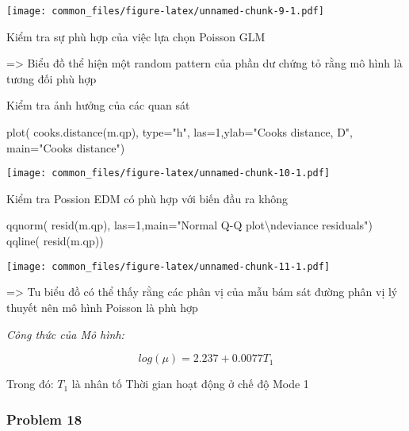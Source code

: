 \documentclass[
]{article}
\newenvironment{Shaded}{\begin{snugshade}}{\end{snugshade}}
\newcommand{\AttributeTok}[1]{\textcolor[rgb]{0.77,0.63,0.00}{#1}}
\newcommand{\DecValTok}[1]{\textcolor[rgb]{0.00,0.00,0.81}{#1}}
\newcommand{\FunctionTok}[1]{\textcolor[rgb]{0.00,0.00,0.00}{#1}}
\newcommand{\NormalTok}[1]{#1}
\newcommand{\SpecialCharTok}[1]{\textcolor[rgb]{0.00,0.00,0.00}{#1}}
\newcommand{\StringTok}[1]{\textcolor[rgb]{0.31,0.60,0.02}{#1}}
\begin{document}
\texttt{[image: common\_files/figure-latex/unnamed-chunk-9-1.pdf]}

Kiểm tra sự phù hợp của việc lựa chọn Poisson GLM

=\textgreater{} Biểu đồ thể hiện một random pattern của phần dư chứng tỏ
rằng mô hình là tương đối phù hợp

Kiểm tra ảnh hưởng của các quan sát

\begin{Shaded}
\begin{Highlighting}[]
\FunctionTok{plot}\NormalTok{( }\FunctionTok{cooks.distance}\NormalTok{(m.qp), }\AttributeTok{type=}\StringTok{"h"}\NormalTok{, }\AttributeTok{las=}\DecValTok{1}\NormalTok{,}\AttributeTok{ylab=}\StringTok{"Cook\textquotesingle{}s distance, D"}\NormalTok{, }\AttributeTok{main=}\StringTok{"Cook\textquotesingle{}s distance"}\NormalTok{)}
\end{Highlighting}
\end{Shaded}

\texttt{[image: common\_files/figure-latex/unnamed-chunk-10-1.pdf]}

Kiểm tra Possion EDM có phù hợp với biến đầu ra không

\begin{Shaded}
\begin{Highlighting}[]
\FunctionTok{qqnorm}\NormalTok{( }\FunctionTok{resid}\NormalTok{(m.qp), }\AttributeTok{las=}\DecValTok{1}\NormalTok{,}\AttributeTok{main=}\StringTok{"Normal Q{-}Q plot}\SpecialCharTok{\textbackslash{}n}\StringTok{deviance residuals"}\NormalTok{)}
\FunctionTok{qqline}\NormalTok{( }\FunctionTok{resid}\NormalTok{(m.qp))}
\end{Highlighting}
\end{Shaded}

\texttt{[image: common\_files/figure-latex/unnamed-chunk-11-1.pdf]}

=\textgreater{} Tu biểu đồ có thể thấy rằng các phân vị của mẫu bám sát
đường phân vị lý thuyết nên mô hình Poisson là phù hợp

\emph{Công thức của Mô hình:}

\[
log(\mu) = 2.237 + 0.0077T_{1}
\]

Trong đó: \(T_{1}\) là nhân tố Thời gian hoạt động ở chế độ Mode 1

\hypertarget{problem-18}{%
\subsubsection{Problem 18}\label{problem-18}}
\end{document}

